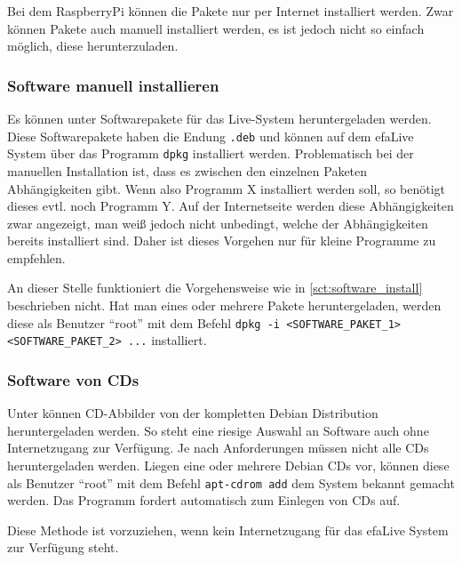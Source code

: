 \documentclass[a4paper,12pt,twoside]{article}
\begin{document}
Bei dem RaspberryPi können die Pakete nur per Internet installiert werden. 
Zwar können Pakete auch manuell installiert werden, es ist jedoch nicht 
so einfach möglich, diese herunterzuladen.


\subsubsection{Software manuell installieren}
\label{sct:software_manuell}
Es können unter \cite{DEB3} Softwarepakete für das Live-System
heruntergeladen werden. Diese Softwarepakete haben die Endung
\texttt{.deb} und können auf dem efaLive System
über das Programm \texttt{dpkg} installiert werden. Problematisch bei der
manuellen Installation ist, dass es zwischen den einzelnen Paketen
Abhängigkeiten gibt. Wenn also Programm X installiert werden soll, so
benötigt dieses evtl. noch Programm Y. Auf der Internetseite werden
diese Abhängigkeiten zwar angezeigt, man weiß jedoch nicht unbedingt,
welche der Abhängigkeiten bereits installiert sind. Daher ist dieses
Vorgehen nur für kleine Programme zu empfehlen.

An dieser Stelle funktioniert die Vorgehensweise wie in \ref{sct:software_install}
beschrieben nicht. Hat man eines oder mehrere Pakete heruntergeladen,
werden diese als Benutzer "`root"' mit dem
Befehl \texttt{dpkg -i {\textless}SOFTWARE\_PAKET\_1{\textgreater}
{\textless}SOFTWARE\_PAKET\_2{\textgreater} ...} installiert. 


\subsubsection{Software von CDs}
\label{sct:software_cd}
Unter \cite{DEB4} können CD-Abbilder von der kompletten Debian
Distribution heruntergeladen werden. So steht eine riesige Auswahl an
Software auch ohne Internetzugang zur Verfügung. Je nach Anforderungen
müssen nicht alle CDs heruntergeladen werden. Liegen eine oder mehrere
Debian CDs vor, können diese als Benutzer
"`root"' mit dem Befehl
\texttt{apt-cdrom add} dem System bekannt gemacht
werden. Das Programm fordert automatisch zum Einlegen von CDs auf.

Diese Methode ist vorzuziehen, wenn kein Internetzugang für das efaLive
System zur Verfügung steht.
\end{document}
